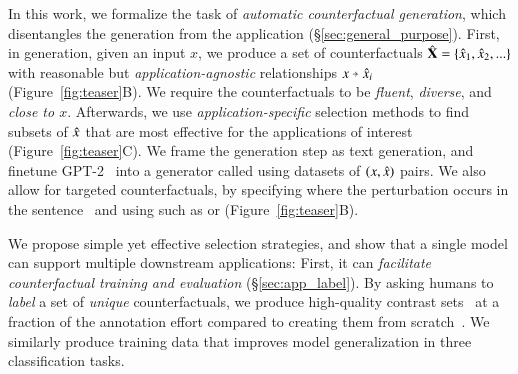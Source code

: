 In this work, we formalize the task of \emph{automatic counterfactual generation}, which disentangles the generation from the application (\S\ref{sec:general_purpose}).
First, in generation, given an input $x$, we produce a set of counterfactuals $\hat{\mathbf{X}} = \{\hat{x}_1, \hat{x}_2, ...\}$ with reasonable but \emph{application-agnostic} relationships $x \veryshortarrow \xp_i$ (Figure~\ref{fig:teaser}B).
We require the counterfactuals to be \emph{fluent}, \emph{diverse}, and \emph{close to $x$}.
Afterwards, we use \emph{application-specific} selection methods to find subsets of $\hat{x}$ that are most effective for the applications of interest (Figure~\ref{fig:teaser}C).
We frame the generation step as text generation, and finetune GPT-2~\cite{radford2019language} into a generator called \emph{\sysname} using datasets of $(x, \hat{x})$ pairs. 
We also allow for targeted counterfactuals, by specifying where the perturbation occurs in the sentence~\cite{donahue2020enabling} and using \tagstrs such as  or  (Figure~\ref{fig:teaser}B).%

We propose simple yet effective selection strategies, and show that a single \sysname model can support multiple downstream applications:
First, it can \emph{facilitate counterfactual training and evaluation} (\S\ref{sec:app_label}). 
By asking humans to \emph{label} a set of \emph{unique} counterfactuals, we produce high-quality contrast sets~\cite{gardner2020contrast} at a fraction of the annotation effort compared to creating them from scratch~\cite{kaushik2019learning}.
We similarly produce training data that improves model generalization in three classification tasks. %

